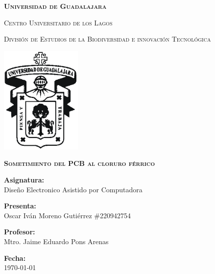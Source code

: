 \documentclass[12pt]{report}
\begin{document}
\setlength{\hoffset}{27 pt} %
\begin{titlepage}
{\centering
{\scshape\bfseries\fontsize{29.16}{34.992}\selectfont Universidad de Guadalajara \par}
\vspace{0.5cm}
{\scshape\Large Centro Universitario de los Lagos \par}
\vspace{1cm}
{\scshape\Large División de Estudios de la Biodiversidad e innovación Tecnológica \par}
\vspace{1cm}
{\graphicspath{{imagenes/Portada}} %
\includegraphics[width=0.3\textwidth]{image.png}\par}
\vspace{1cm}
{\scshape\large\bfseries Sometimiento del PCB al cloruro férrico \par}
\vspace{1.5cm}
{\large \textbf{Asignatura:} \\Diseño Electronico Asistido por Computadora\par}
\vfill
{\large \textbf{Presenta:} \\Oscar Iván Moreno Gutiérrez \#220942754\par}
\vfill
{\large \textbf{Profesor:} \\Mtro. Jaime Eduardo Pons Arenas \par}
\vfill
\vfill
\begin{flushright}
  {\normalsize \textbf {Fecha:} \\ \today}
\end{flushright}
\vfill}
{\large  \par}
\end{titlepage}

\tableofcontents
\newpage
\end{document}
